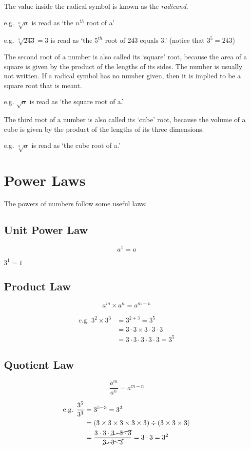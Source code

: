 \documentclass{article}
\begin{document}
The value inside the radical symbol is known as the \textit{radicand}.

e.g.	$\sqrt[n]{a}$ is read as ‘the $n^{th}$ root of a’

e.g.	$\sqrt[5]{243}=3$ is read as ‘the $5^{th}$ root of 243 equals 3.’
(notice that $3^5 = 243$)

The second root of a number is also called its ‘square’ root, because the area of a square is given by the product of the lengths of its sides. The number is usually not written. If a radical symbol has no number given, then it is implied to be a square root that is meant.

e.g.	$\sqrt{a}$ is read as ‘the square root of a.’

The third root of a number is also called its ‘cube’ root, because the volume of a cube is given by the product of the lengths of its three dimensions.

e.g.	$\sqrt[3]{a}$ is read as ‘the cube root of a.’

\newpage

\section{Power Laws}

The powers of numbers follow some useful laws:

\subsection{Unit Power Law}
\begin{center}
\begin{Large}
$$a^1=a$$
\end{Large}
$3^1=1$
\end{center}

\subsection{Product Law}
\begin{Large}
$$a^m\times a^n=a^{m+n}$$
\end{Large}
\begin{align*}
\text{e.g. }{3^2 \times 3^3}&={3^{2+3} = 3^5}\\
&={3 \cdot 3 \times 3 \cdot 3 \cdot 3}\\
&={3 \cdot 3 \cdot 3 \cdot 3 \cdot 3} = 3^5
\end{align*}

\subsection{Quotient Law}
\begin{Large}
$$\frac{a^m}{a^n}=a^{m-n}$$
\end{Large}
\begin{align*}
\text{e.g. }\frac{3^5}{3^3}&=3^{5-3}=3^2\\
&=(3 \times 3 \times 3 \times 3 \times 3) \div (3\times 3 \times 3 )\\
&=\frac{3 \cdot 3 \cdot \cancel{3 \cdot 3 \cdot 3}}{\cancel{3 \cdot 3 \cdot 3}}=3 \cdot 3=3^2
\end{align*}
\end{document}
